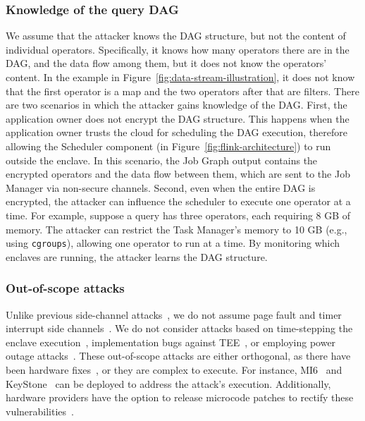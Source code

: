 \subsubsection*{Knowledge of the query DAG} We assume that the attacker knows the DAG structure, but not the content of individual operators. Specifically, it knows how many operators there are in the DAG, and the data flow among them, but it does not know the operators' content. In the example in Figure~\ref{fig:data-stream-illustration}, it does not know that the first operator is a map and the two operators after that are filters. There are two scenarios in which the attacker gains knowledge of the DAG. First, the application owner does not encrypt the DAG structure. This happens when the application owner trusts the cloud for scheduling the DAG execution, therefore allowing the Scheduler component (in Figure~\ref{fig:flink-architecture}) to run outside the enclave. In this scenario, the Job Graph output contains the encrypted operators and the data flow between them, which are sent to the Job Manager via non-secure channels. Second, even when the entire DAG is encrypted, the attacker can influence the scheduler to execute one operator at a time. {For example, suppose a query has three operators, each requiring 8 GB of memory. The attacker can restrict the Task Manager’s memory to 10 GB (e.g., using \texttt {cgroups}), allowing one operator to run at a time. By monitoring which enclaves are running, the attacker learns the DAG structure.}




\subsubsection*{Out-of-scope attacks} {Unlike previous side-channel attacks~\cite{van2017telling, wang2017leaky,van2017sgx,Jaehyuk17,chen2021voltpillager}, we do not assume page fault and timer
interrupt side channels~\cite{van2017telling, wang2017leaky}. We do not consider attacks based on time-stepping the 
enclave execution~\cite{van2017sgx}, implementation bugs against TEE~\cite{Jaehyuk17}, or employing power outage attacks~\cite{chen2021voltpillager}.
%
These out-of-scope attacks are either orthogonal, as there have been hardware
fixes~\cite{constable2023aex}, or they are complex to execute.
%
For instance, MI6~\cite{Bourgeat19} and KeyStone~\cite{Lee20} can be deployed to address the attack's execution. 
%
Additionally, hardware providers have the option to release microcode patches to rectify these vulnerabilities~\cite{Bourgeat19,Costan161, constable2023aex}.
%
}

